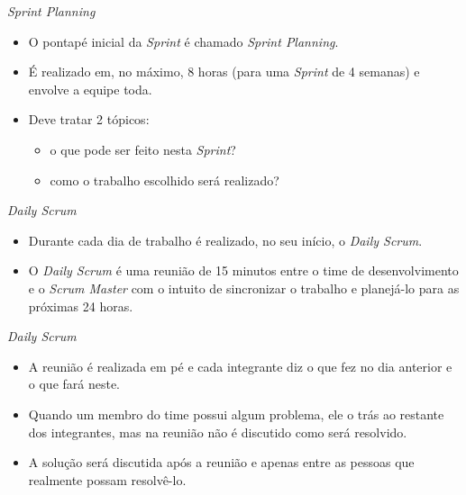 \documentclass[11pt]{beamer}
\begin{document}
    \begin{frame}{\textit{Sprint Planning}}
      \begin{itemize}
         \item O pontapé inicial da \textit{Sprint} é chamado \textit{Sprint Planning}.
         \item É realizado em, no máximo, 8 horas (para uma \textit{Sprint} de 4 semanas) e envolve a equipe toda.
         \item Deve tratar 2 tópicos:
           \begin{itemize}
              \item o que pode ser feito nesta \textit{Sprint}?
              \item como o trabalho escolhido será realizado?
           \end{itemize}
      \end{itemize}
    \end{frame}
    
    \begin{frame}{\textit{Daily Scrum}}
      \begin{itemize}
         \item Durante cada dia de trabalho é realizado, no seu início, o \textit{Daily Scrum}. 
         \item O \textit{Daily Scrum} é uma reunião de 15 minutos entre o time de desenvolvimento e o \textit{Scrum Master} com o intuito de sincronizar o trabalho e planejá-lo para as próximas 24 horas.
      \end{itemize}
    \end{frame}

    \begin{frame}{\textit{Daily Scrum}}
      \begin{itemize}
         \item A reunião é realizada em pé e cada integrante diz o que fez no dia anterior e o que fará neste.
         \item Quando um membro do time possui algum problema, ele o trás ao restante dos integrantes, mas na reunião não é discutido como será resolvido.
         \item A solução será discutida após a reunião e apenas entre as pessoas que realmente possam resolvê-lo.
      \end{itemize}
    \end{frame}
\end{document}
